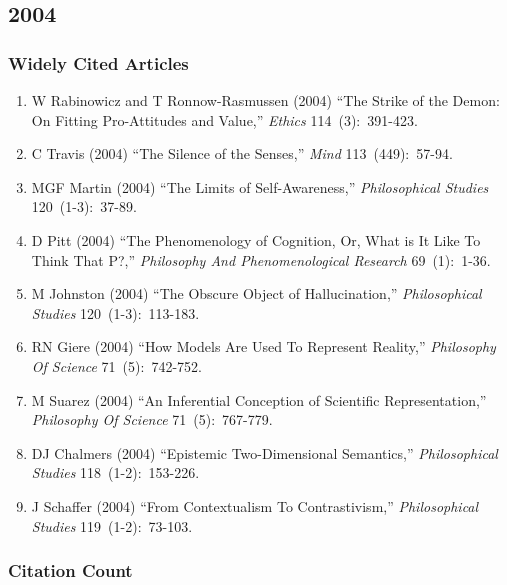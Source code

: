 \documentclass[
  10pt,
  letterpaper,
  DIV=11,
  numbers=noendperiod,
  twoside]{scrartcl}
\providecommand{\tightlist}{%
  \setlength{\itemsep}{0pt}\setlength{\parskip}{0pt}}\usepackage{longtable,booktabs,array}
\begin{document}
\newpage

\subsection{2004}\label{sec-s2004}

\subsubsection*{Widely Cited Articles}\label{widely-cited-articles-47}

\begin{enumerate}
\def\labelenumi{\arabic{enumi}.}
\tightlist
\item
  W Rabinowicz and T Ronnow-Rasmussen (2004) ``The Strike of the Demon:
  On Fitting Pro-Attitudes and Value,'' \emph{Ethics} 114~(3):~391-423.
\item
  C Travis (2004) ``The Silence of the Senses,'' \emph{Mind}
  113~(449):~57-94.
\item
  MGF Martin (2004) ``The Limits of Self-Awareness,''
  \emph{Philosophical Studies} 120~(1-3):~37-89.
\item
  D Pitt (2004) ``The Phenomenology of Cognition, Or, What is It Like To
  Think That P?,'' \emph{Philosophy And Phenomenological Research}
  69~(1):~1-36.
\item
  M Johnston (2004) ``The Obscure Object of Hallucination,''
  \emph{Philosophical Studies} 120~(1-3):~113-183.
\item
  RN Giere (2004) ``How Models Are Used To Represent Reality,''
  \emph{Philosophy Of Science} 71~(5):~742-752.
\item
  M Suarez (2004) ``An Inferential Conception of Scientific
  Representation,'' \emph{Philosophy Of Science} 71~(5):~767-779.
\item
  DJ Chalmers (2004) ``Epistemic Two-Dimensional Semantics,''
  \emph{Philosophical Studies} 118~(1-2):~153-226.
\item
  J Schaffer (2004) ``From Contextualism To Contrastivism,''
  \emph{Philosophical Studies} 119~(1-2):~73-103.
\end{enumerate}

\subsubsection*{Citation Count}\label{sec-count-2004}
\end{document}
